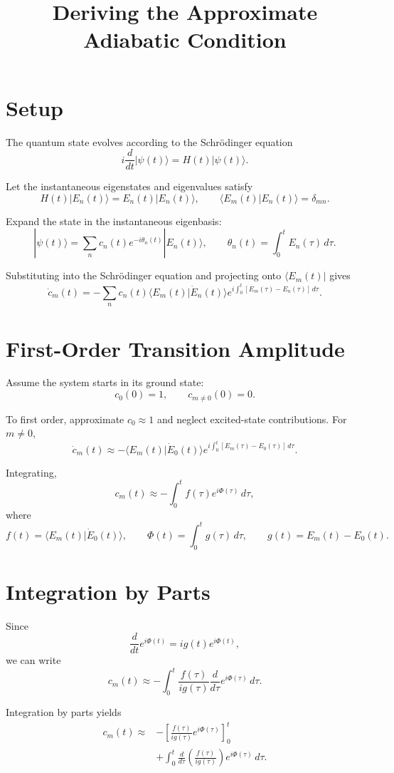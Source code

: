 \documentclass[11pt]{article}
\title{Deriving the Approximate Adiabatic Condition}
\date{}
\begin{document}
\maketitle

\section{Setup}

The quantum state evolves according to the Schrödinger equation
\[
i\frac{d}{dt}|\psi(t)\rangle=H(t)|\psi(t)\rangle.
\]

Let the instantaneous eigenstates and eigenvalues satisfy
\[
H(t)|E_n(t)\rangle=E_n(t)|E_n(t)\rangle,
\qquad
\langle E_m(t)|E_n(t)\rangle=\delta_{mn}.
\]

Expand the state in the instantaneous eigenbasis:
\[
|\psi(t)\rangle
=\sum_n c_n(t)e^{-i\theta_n(t)}|E_n(t)\rangle,
\qquad
\theta_n(t)=\int_0^t E_n(\tau)\,d\tau.
\]

Substituting into the Schr\"odinger equation and projecting onto
$\langle E_m(t)|$ gives
\[
\dot c_m(t)=
-\sum_n c_n(t)
\langle E_m(t)|\dot E_n(t)\rangle
e^{i\int_0^t [E_m(\tau)-E_n(\tau)]\,d\tau}.
\]

\section{First-Order Transition Amplitude}

Assume the system starts in its ground state:
\[
c_0(0)=1,\qquad c_{m\ne 0}(0)=0.
\]

To first order, approximate $c_0\approx 1$ and neglect excited-state
contributions. For $m\ne 0$,
\[
\dot c_m(t)\approx
-\langle E_m(t)|\dot E_0(t)\rangle
e^{i\int_0^t [E_m(\tau)-E_0(\tau)]\,d\tau}.
\]

Integrating,
\[
c_m(t)\approx
-\int_0^t f(\tau)e^{i\Phi(\tau)}\,d\tau,
\]
where
\[
f(t)=\langle E_m(t)|\dot E_0(t)\rangle,
\qquad
\Phi(t)=\int_0^t g(\tau)\,d\tau,
\qquad
g(t)=E_m(t)-E_0(t).
\]

\section{Integration by Parts}

Since
\[
\frac{d}{dt}e^{i\Phi(t)}=ig(t)e^{i\Phi(t)},
\]
we can write
\[
c_m(t)\approx
-\int_0^t \frac{f(\tau)}{ig(\tau)}
\frac{d}{d\tau}e^{i\Phi(\tau)}\,d\tau.
\]

Integration by parts yields
\[
\begin{aligned}
c_m(t)\approx{}&
-\left[\frac{f(\tau)}{ig(\tau)}
e^{i\Phi(\tau)}\right]_0^t\\
&+\int_0^t
\frac{d}{d\tau}\left(\frac{f(\tau)}{ig(\tau)}\right)
e^{i\Phi(\tau)}\,d\tau.
\end{aligned}
\]
\end{document}
